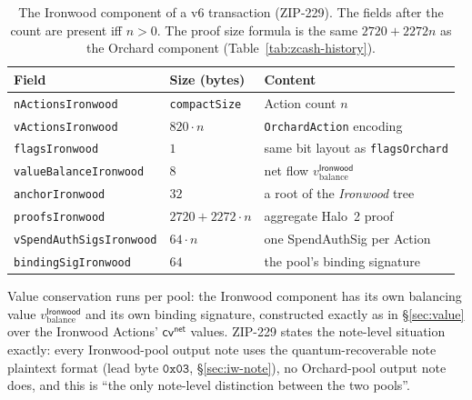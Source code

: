 \documentclass[11pt,a4paper]{article}
\theoremstyle{definition}
\newcommand{\cvsym}{\mathsf{cv}}
\begin{document}
\begin{table}[h]\centering\small
\begin{tabular}{@{}lll@{}}
\toprule
Field & Size (bytes) & Content \\
\midrule
\texttt{nActionsIronwood} & \texttt{compactSize} & Action count $n$ \\
\texttt{vActionsIronwood} & $820 \cdot n$ & \texttt{OrchardAction} encoding \\
\texttt{flagsIronwood} & $1$ & same bit layout as \texttt{flagsOrchard} \\
\texttt{valueBalanceIronwood} & $8$ &
net flow $v_{\mathrm{balance}}^{\mathsf{Ironwood}}$ \\
\texttt{anchorIronwood} & $32$ & a root of the \emph{Ironwood} tree \\
\texttt{proofsIronwood} & $2720 + 2272 \cdot n$ & aggregate Halo~2 proof \\
\texttt{vSpendAuthSigsIronwood} & $64 \cdot n$ & one SpendAuthSig per Action \\
\texttt{bindingSigIronwood} & $64$ & the pool's binding signature \\
\bottomrule
\end{tabular}
\caption{The Ironwood component of a v6 transaction (ZIP-229). The fields
after the count are present iff $n > 0$. The proof size formula is the same
$2720 + 2272 n$ as the Orchard component
(Table~\ref{tab:zcash-history}).}\label{tab:iw-v6}
\end{table}

Value conservation runs per pool: the Ironwood component has its own
balancing value $v_{\mathrm{balance}}^{\mathsf{Ironwood}}$ and its own
binding signature, constructed exactly as in \S\ref{sec:value} over the
Ironwood Actions' $\cvsym^{\mathsf{net}}$ values. ZIP-229 states the
note-level situation exactly: every Ironwood-pool output note uses the
quantum-recoverable note plaintext format (lead byte $\mathtt{0x03}$,
\S\ref{sec:iw-note}), no Orchard-pool output note does, and this is ``the
only note-level distinction between the two pools''.
\end{document}
